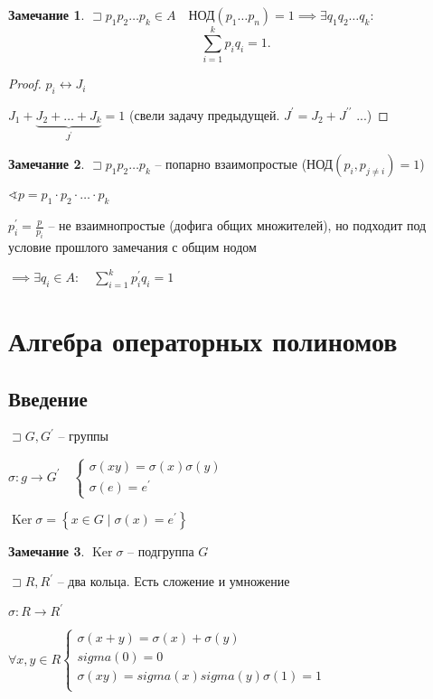 \documentclass{book}
\newcommand{\p}[1]{#1^{\prime}}
\newcommand{\pp}[1]{#1^{\prime\prime}}
\DeclareMathOperator{\Ker}{Ker}
\theoremstyle{definition}
\newtheorem*{note}{Замечание}
\begin{document}
\begin{note}
    $\sqsupset p_1p_2 \ldots p_k\in A\quad \text{НОД}\left( p_1 \ldots p_n \right) = 1 \implies \exists q_1q_2 \ldots q_k:$
    \[
    \sum_{i=1}^{k} p_iq_i = 1
    .\] 
\end{note}
\begin{proof}
    $p_i \leftrightarrow J_i$

    $J_1 + \underbrace{J_2 + \ldots + J_k}_{\p J} = 1$ (свели задачу предыдущей. $\p J = J_2 + \pp J$ ...)
\end{proof}

\begin{note}
    $\sqsupset p_1p_2\ldots p_k$ -- попарно взаимопростые ($\text{НОД}\left( p_i, p_{j\neq i} \right) =1$)

    $\sphericalangle p = p_1\cdot p_2\cdot \ldots \cdot p_k$

    $\p p_i = \frac{p}{p_i}$ -- не взаимнопростые (дофига общих множителей), но подходит под условие прошлого замечания с общим нодом

    $\implies \exists q_i\in A:\quad  \sum_{i=1}^{k} \p p_iq_i = 1$
\end{note}

\section{Алгебра операторных полиномов}

\subsection{Введение}

$\sqsupset G, \p G$ -- группы

$\sigma: g\to \p G\quad \begin{cases}
    \sigma\left(xy  \right) =\sigma(x)\sigma(y)\\
    \sigma(e) = \p e
\end{cases}$ 

$\Ker \sigma = \left\{ x\in G \mid \sigma(x) = \p e \right\} $

\begin{note}
    $\Ker \sigma$ -- подгруппа  $G$
\end{note}

$\sqsupset R, \p R$ -- два кольца. Есть сложение и умножение

$\sigma: R\to \p R$

$\forall x, y\in R \begin{cases}
\sigma(x+y) = \sigma(x) + \sigma(y)\\
sigma(0) = 0\\
\sigma(xy) = sigma(x)sigma(y)
\sigma(1) = 1\\
\end{cases}$
\end{document}
